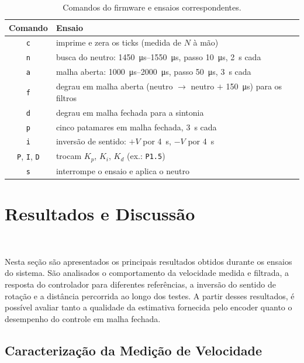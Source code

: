\documentclass[12pt]{article}
\begin{document}
\begin{table}[H]
  \centering
  \caption{Comandos do firmware e ensaios correspondentes.}
  \label{tab:comandos}
  \begin{tabular}{cl}
    \toprule
    Comando & Ensaio \\
    \midrule
    \texttt{c} & imprime e zera os ticks (medida de $N$ à mão) \\
    \texttt{n} & busca do neutro: \SIrange{1450}{1550}{\micro\second}, passo \SI{10}{\micro\second}, \SI{2}{\second} cada \\
    \texttt{a} & malha aberta: \SIrange{1000}{2000}{\micro\second}, passo \SI{50}{\micro\second}, \SI{3}{\second} cada \\
    \texttt{f} & degrau em malha aberta (neutro $\to$ neutro $+$ \SI{150}{\micro\second}) para os filtros \\
    \texttt{d} & degrau em malha fechada para a sintonia \\
    \texttt{p} & cinco patamares em malha fechada, \SI{3}{\second} cada \\
    \texttt{i} & inversão de sentido: $+V$ por \SI{4}{\second}, $-V$ por \SI{4}{\second} \\
    \texttt{P}, \texttt{I}, \texttt{D} & trocam $K_p$, $K_i$, $K_d$ (ex.: \texttt{P1.5}) \\
    \texttt{s} & interrompe o ensaio e aplica o neutro \\
    \bottomrule
  \end{tabular}
\end{table}

\section{Resultados e Discussão}\

Nesta seção são apresentados os principais resultados obtidos durante os ensaios do sistema. São analisados o comportamento da velocidade medida e filtrada, a resposta do controlador para diferentes referências, a inversão do sentido de rotação e a distância percorrida ao longo dos testes. A partir desses resultados, é possível avaliar tanto a qualidade da estimativa fornecida pelo encoder quanto o desempenho do controle em malha fechada.

\subsection{Caracterização da Medição de Velocidade}\
\end{document}
